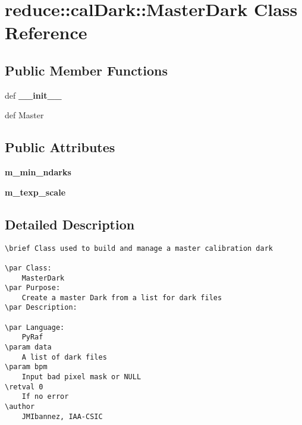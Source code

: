 \section{reduce::cal\-Dark::Master\-Dark Class Reference}
\label{classreduce_1_1calDark_1_1MasterDark}
\subsection*{Public Member Functions}
\begin{CompactItemize}
\item 
def \textbf{\_\-\_\-init\_\-\_\-}\label{classreduce_1_1calDark_1_1MasterDark_f9ef02c78d586854d1296b7ea61de85d}

\item 
def {\bfcreate\-Master}
\end{CompactItemize}
\subsection*{Public Attributes}
\begin{CompactItemize}
\item 
\textbf{m\_\-min\_\-ndarks}\label{classreduce_1_1calDark_1_1MasterDark_2c3031e72229a3587e77a3130f619b8f}

\item 
\textbf{m\_\-texp\_\-scale}\label{classreduce_1_1calDark_1_1MasterDark_860949fd22aff6e86ef6e49de40a15a6}

\end{CompactItemize}


\subsection{Detailed Description}


\footnotesize\begin{verbatim}
\brief Class used to build and manage a master calibration dark 

\par Class:
    MasterDark
\par Purpose:
    Create a master Dark from a list for dark files
\par Description:
        
\par Language:
    PyRaf
\param data
    A list of dark files
\param bpm
    Input bad pixel mask or NULL
\retval 0
    If no error
\author
    JMIbannez, IAA-CSIC
    
\end{verbatim}
\normalsize
 



